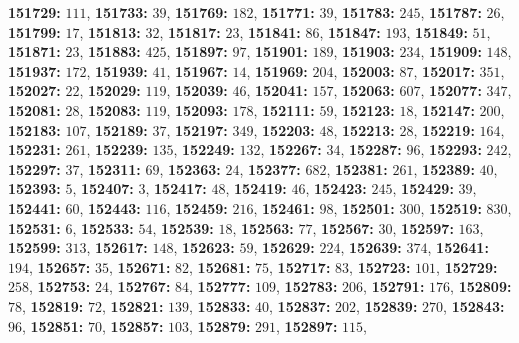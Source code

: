 \textsf{\bfseries 151729:} $111$, \textsf{\bfseries 151733:} $39$, \textsf{\bfseries 151769:} $182$, \textsf{\bfseries 151771:} $39$, \textsf{\bfseries 151783:} $245$, \textsf{\bfseries 151787:} $26$, \textsf{\bfseries 151799:} $17$, \textsf{\bfseries 151813:} $32$, \textsf{\bfseries 151817:} $23$, \textsf{\bfseries 151841:} $86$, \textsf{\bfseries 151847:} $193$, \textsf{\bfseries 151849:} $51$, \textsf{\bfseries 151871:} $23$, \textsf{\bfseries 151883:} $425$, \textsf{\bfseries 151897:} $97$, \textsf{\bfseries 151901:} $189$, \textsf{\bfseries 151903:} $234$, \textsf{\bfseries 151909:} $148$, \textsf{\bfseries 151937:} $172$, \textsf{\bfseries 151939:} $41$, \textsf{\bfseries 151967:} $14$, \textsf{\bfseries 151969:} $204$, \textsf{\bfseries 152003:} $87$, \textsf{\bfseries 152017:} $351$, \textsf{\bfseries 152027:} $22$, \textsf{\bfseries 152029:} $119$, \textsf{\bfseries 152039:} $46$, \textsf{\bfseries 152041:} $157$, \textsf{\bfseries 152063:} $607$, \textsf{\bfseries 152077:} $347$, \textsf{\bfseries 152081:} $28$, \textsf{\bfseries 152083:} $119$, \textsf{\bfseries 152093:} $178$, \textsf{\bfseries 152111:} $59$, \textsf{\bfseries 152123:} $18$, \textsf{\bfseries 152147:} $200$, \textsf{\bfseries 152183:} $107$, \textsf{\bfseries 152189:} $37$, \textsf{\bfseries 152197:} $349$, \textsf{\bfseries 152203:} $48$, \textsf{\bfseries 152213:} $28$, \textsf{\bfseries 152219:} $164$, \textsf{\bfseries 152231:} $261$, \textsf{\bfseries 152239:} $135$, \textsf{\bfseries 152249:} $132$, \textsf{\bfseries 152267:} $34$, \textsf{\bfseries 152287:} $96$, \textsf{\bfseries 152293:} $242$, \textsf{\bfseries 152297:} $37$, \textsf{\bfseries 152311:} $69$, \textsf{\bfseries 152363:} $24$, \textsf{\bfseries 152377:} $682$, \textsf{\bfseries 152381:} $261$, \textsf{\bfseries 152389:} $40$, \textsf{\bfseries 152393:} $5$, \textsf{\bfseries 152407:} $3$, \textsf{\bfseries 152417:} $48$, \textsf{\bfseries 152419:} $46$, \textsf{\bfseries 152423:} $245$, \textsf{\bfseries 152429:} $39$, \textsf{\bfseries 152441:} $60$, \textsf{\bfseries 152443:} $116$, \textsf{\bfseries 152459:} $216$, \textsf{\bfseries 152461:} $98$, \textsf{\bfseries 152501:} $300$, \textsf{\bfseries 152519:} $830$, \textsf{\bfseries 152531:} $6$, \textsf{\bfseries 152533:} $54$, \textsf{\bfseries 152539:} $18$, \textsf{\bfseries 152563:} $77$, \textsf{\bfseries 152567:} $30$, \textsf{\bfseries 152597:} $163$, \textsf{\bfseries 152599:} $313$, \textsf{\bfseries 152617:} $148$, \textsf{\bfseries 152623:} $59$, \textsf{\bfseries 152629:} $224$, \textsf{\bfseries 152639:} $374$, \textsf{\bfseries 152641:} $194$, \textsf{\bfseries 152657:} $35$, \textsf{\bfseries 152671:} $82$, \textsf{\bfseries 152681:} $75$, \textsf{\bfseries 152717:} $83$, \textsf{\bfseries 152723:} $101$, \textsf{\bfseries 152729:} $258$, \textsf{\bfseries 152753:} $24$, \textsf{\bfseries 152767:} $84$, \textsf{\bfseries 152777:} $109$, \textsf{\bfseries 152783:} $206$, \textsf{\bfseries 152791:} $176$, \textsf{\bfseries 152809:} $78$, \textsf{\bfseries 152819:} $72$, \textsf{\bfseries 152821:} $139$, \textsf{\bfseries 152833:} $40$, \textsf{\bfseries 152837:} $202$, \textsf{\bfseries 152839:} $270$, \textsf{\bfseries 152843:} $96$, \textsf{\bfseries 152851:} $70$, \textsf{\bfseries 152857:} $103$, \textsf{\bfseries 152879:} $291$, \textsf{\bfseries 152897:} $115$, 
